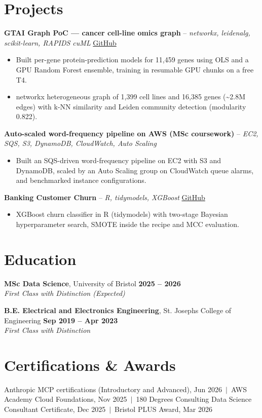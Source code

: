 \documentclass[a4paper,11pt]{article}
\begin{document}
\section{Projects}
\noindent\textbf{GTAI Graph PoC — cancer cell-line omics graph} -- \textit{networkx, leidenalg, scikit-learn, RAPIDS cuML} \hfill \href{https://github.com/Thiruvel-AP/GTAI-GraphPOC}{GitHub}
\begin{itemize}
  \item Built per-gene protein-prediction models for 11,459 genes using OLS and a GPU Random Forest ensemble, training in resumable GPU chunks on a free T4.
  \item networkx heterogeneous graph of 1,399 cell lines and 16,385 genes (\textasciitilde{}2.8M edges) with k-NN similarity and Leiden community detection (modularity 0.822).
\end{itemize}
\vspace{3pt}
\noindent\textbf{Auto-scaled word-frequency pipeline on AWS (MSc coursework)} -- \textit{EC2, SQS, S3, DynamoDB, CloudWatch, Auto Scaling} \hfill 
\begin{itemize}
  \item Built an SQS-driven word-frequency pipeline on EC2 with S3 and DynamoDB, scaled by an Auto Scaling group on CloudWatch queue alarms, and benchmarked instance configurations.
\end{itemize}
\vspace{3pt}
\noindent\textbf{Banking Customer Churn} -- \textit{R, tidymodels, XGBoost} \hfill \href{https://github.com/Thiruvel-AP/Banking-Customer-Churn-Prediction}{GitHub}
\begin{itemize}
  \item XGBoost churn classifier in R (tidymodels) with two-stage Bayesian hyperparameter search, SMOTE inside the recipe and MCC evaluation.
\end{itemize}

\section{Education}
\textbf{MSc Data Science}, University of Bristol \hfill \textbf{2025 – 2026}\\ \textit{First Class with Distinction (Expected)}\par
\vspace{3pt}
\textbf{B.E. Electrical and Electronics Engineering}, St. Joseph\textquotesingle{}s College of Engineering \hfill \textbf{Sep 2019 – Apr 2023}\\ \textit{First Class with Distinction}\par

\section{Certifications \& Awards}
Anthropic MCP certifications (Introductory and Advanced), Jun 2026 \,$|$\, AWS Academy Cloud Foundations, Nov 2025 \,$|$\, 180 Degrees Consulting Data Science Consultant Certificate, Dec 2025 \,$|$\, Bristol PLUS Award, Mar 2026
\end{document}
